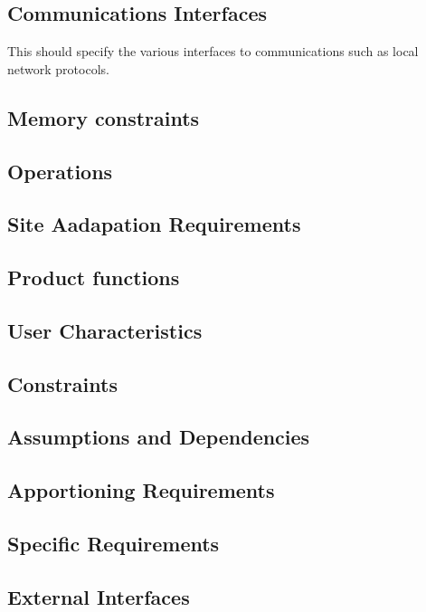 \documentclass[draftclsnofoot, onecolumn, 10pt]{IEEEtran}
\begin{document}
\subsection{Communications Interfaces}
This should specify the various interfaces to communications such as local network protocols.

\subsection{Memory constraints}

\subsection{Operations}

\subsection{Site Aadapation Requirements}

\subsection{Product functions}

\subsection{User Characteristics}

\subsection{Constraints}

\subsection{Assumptions and Dependencies}

\subsection{Apportioning Requirements}

\subsection{Specific Requirements}

\subsection{External Interfaces}
\end{document}
